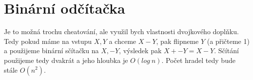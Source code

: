\documentclass[a4paper]{article}
\begin{document}
\renewcommand{\headrulewidth}{0pt} %
\thispagestyle{fancy} %
{}

\section*{Binární odčítačka}
Je to možná trochu cheatování, ale využil bych vlastnosti dvojkového doplňku. Tedy pokud máme na vstupu $X, Y$ a chceme $X - Y$, pak flipneme $Y$ (a přičteme 1) a použijeme binární sčítačku na $X, -Y$, výsledek pak $X + -Y = X - Y$. Sčítání použijeme tedy dvakrát a jeho hloubka je $O(log\ n)$. Počet hradel tedy bude stále $O(n^2)$.
\end{document}

